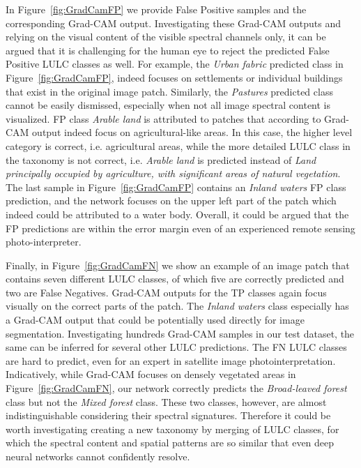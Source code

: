 \documentclass[journal]{IEEEtran}
\begin{document}
In Figure~\ref{fig:GradCamFP} we provide False Positive samples and the corresponding Grad-CAM output. Investigating these Grad-CAM outputs and relying on the visual content of the visible spectral channels only, it can be argued that it is challenging for the human eye to reject the predicted False Positive LULC classes as well. For example, the \textit{Urban fabric} predicted class in Figure~\ref{fig:GradCamFP}, indeed focuses on settlements or individual buildings that exist in the original image patch. Similarly, the \textit{Pastures} predicted class cannot be easily dismissed, especially when not all image spectral content is visualized. FP class \textit{Arable land} is attributed to patches that according to Grad-CAM output indeed focus on agricultural-like areas. In this case, the higher level category is correct, i.e. agricultural areas, while the more detailed LULC class in the taxonomy is not correct, i.e. \textit{Arable land} is predicted instead of \textit{Land principally occupied by agriculture, with significant areas of natural vegetation}. The last sample in Figure~\ref{fig:GradCamFP} contains an \textit{Inland waters} FP class prediction, and the network focuses on the upper left part of the patch which indeed could be attributed to a water body. Overall, it could be argued that the FP predictions are within the error margin even of an experienced remote sensing photo-interpreter. 

Finally, in Figure~\ref{fig:GradCamFN} we show an example of an image patch that contains seven different LULC classes, of which five are correctly predicted and two are False Negatives. Grad-CAM outputs for the TP classes again focus visually on the correct parts of the patch. The \textit{Inland waters} class especially has a Grad-CAM output that could be potentially used directly for image segmentation. Investigating hundreds Grad-CAM samples in our test dataset, the same can be inferred for several other LULC predictions. The FN LULC classes are hard to predict, even for an expert in satellite image photointerpretation. Indicatively, while Grad-CAM focuses on densely vegetated areas in Figure~\ref{fig:GradCamFN}, our network correctly predicts the \textit{Broad-leaved forest} class but not the \textit{Mixed forest} class. These two classes, however, are almost indistinguishable considering their spectral signatures. Therefore it could be worth investigating creating a new taxonomy by merging of LULC classes, for which the spectral content and spatial patterns are so similar that even deep neural networks cannot confidently resolve. 
\end{document}
